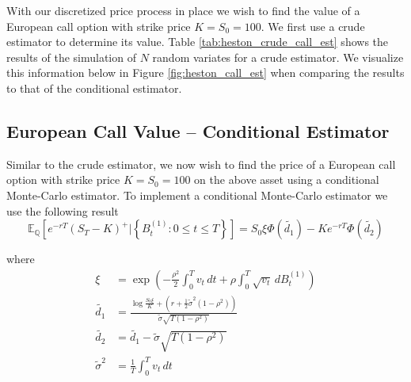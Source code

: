 \documentclass[12pt]{article}
\newlength\tindent
\renewcommand{\indent}{\hspace*{\tindent}}
\begin{document}
\indent With our discretized price process in place we wish to find the value of a European call option with strike price $K = S_0 = 100$. We first use a crude estimator to determine its value. Table \ref{tab:heston_crude_call_est} shows the results of the simulation of $N$ random variates for a crude estimator. We visualize this information below in Figure \ref{fig:heston_call_est} when comparing the results to that of the conditional estimator.

{\footnotesize
{}
}

\subsection{{\normalfont European Call Value -- Conditional Estimator}}

\indent Similar to the crude estimator, we now wish to find the price of a European call option with strike price $K = S_0 = 100$ on the above asset using a conditional Monte-Carlo estimator. To implement a conditional Monte-Carlo estimator we use the following result
\begin{equation*}
	\mathbb E_{\mathbb Q} \left[e^{-rT} \left(S_T - K\right)^+ \Big| \left\{B^{(1)}_t: 0 \leq t \leq T \right\} \right]  = S_0 \xi \Phi(\tilde{d_1}) - Ke^{-rT}\Phi(\tilde{d_2})
\end{equation*}

where
\begin{align*}
	\xi &= \exp \left( -\frac{\rho^2}{2} \int^T_0 v_t\,dt + \rho \int^T_0 \sqrt{v_t}\,dB^{(1)}_t \right) \\
	\tilde{d_1} &= \frac{ \log \frac{S_0\xi}{K} + \left(r + \frac{1}{2}\tilde{\sigma}^2 \left(1 - \rho^2 \right)\right) }{ \tilde{\sigma}\sqrt{T(1 - \rho^2)} } \\
	\tilde{d_2} &= \tilde{d_1} - \tilde{\sigma}\sqrt{T(1 - \rho^2)} \\
	\tilde{\sigma}^2 &= \frac{1}{T} \int^T_0 v_t \,dt
\end{align*}
\end{document}
